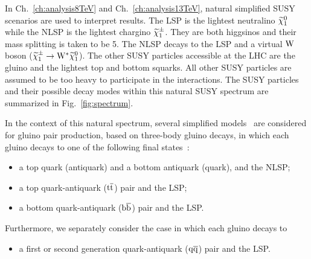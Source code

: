 In Ch.~\ref{ch:analysis8TeV} and Ch.~\ref{ch:analysis13TeV}, natural simplified SUSY scenarios are used to interpret
results. The LSP is the lightest neutralino $\widetilde{\chi}^{0}_1$ while the NLSP
is the lightest chargino $\widetilde{\chi}^{\pm}_1$.  They are both higgsinos and
their mass splitting is taken to be 5\GeV. The NLSP decays to the LSP
and a virtual $\mathrm{W}$ boson ($\widetilde{\chi}^{\pm}_1 \to \mathrm{W}^{\ast} \widetilde{\chi}^{0}_1$). The
other SUSY particles accessible at the LHC are the gluino and the
lightest top and bottom squarks. All other SUSY particles are
assumed to be too heavy to participate in the interactions. The SUSY
particles and their possible decay modes within this natural SUSY
spectrum are summarized in Fig.~\ref{fig:spectrum}.

In the context of this natural spectrum, several simplified
models~\cite{ArkaniHamed:2007fw,Alwall:2008ag,Alwall:2008va,Alves:2011sq,Alves:2011wf,Graesser:2012qy}
are considered for gluino pair production, based on three-body gluino
decays, in which each gluino decays to one of the following final states~\cite{SUS-11-016}:
\begin{itemize}
\item a top quark (antiquark) and a bottom antiquark (quark),
  and the NLSP; 
\item a top quark-antiquark ($\mathrm{t}\overline{\mathrm{t}}$) pair and the LSP;
\item a bottom quark-antiquark ($\mathrm{b}\overline{\mathrm{b}}$) pair and the LSP.
\end{itemize}
Furthermore, we separately consider the case in which each gluino
decays to
\begin{itemize}
\item a first or second generation quark-antiquark ($\mathrm{q}\overline{\mathrm{q}}$) pair and the LSP.
\end{itemize}


